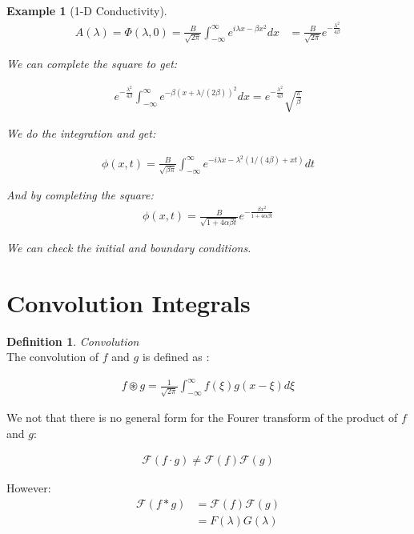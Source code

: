 \documentclass{article}
\newtheorem{ex}{Example}
\theoremstyle{definition}
\newtheorem{definition}{Definition}[section]
\newcommand{\Def}[2]{
\begin{shaded*}
\begin{definition}{\textit{#1}}\\#2\end{definition}
\end{shaded*}
}
\def\F{\mathcal{F}}
\def\conv{\circledast}
\begin{document}
\begin{ex}[1-D Conductivity]
\begin{align*}
A(\lambda) = \Phi(\lambda, 0) = \frac{B}{\sqrt{2 \pi}} \int_{-\infty}^{\infty}  e^{i\lambda x - \beta x^2} dx
&= \frac{B}{\sqrt{2 \pi}}  e^{-\frac{\lambda^2}{4\beta}}
\end{align*}

We can complete the square to get:

\begin{align*}
e^{-\frac{\lambda^2}{4\beta}} \int_{-\infty}^\infty e^{-\beta (x + \lambda / (2\beta))^2} dx = e^{-\frac{\lambda^2}{4\beta}} \sqrt{\frac{\pi}{\beta}}
\end{align*}

We do the integration and get:

\begin{align*}
\phi(x,t) = \frac{B}{\sqrt{\beta \pi}} \int_{-\infty}^\infty e^{- i \lambda x-\lambda^2 (1/(4\beta) + x t)} dt 
\end{align*}

And by completing the square: 
\begin{align*}
\phi(x,t) = \frac{B}{\sqrt{1 + 4 \alpha \beta t}} e^{-\frac{\beta x^2}{1 + 4 \alpha \beta t}}
\end{align*}

We can check the initial and boundary conditions.

\end{ex}


\section{Convolution Integrals}

\Def{Convolution}{
The convolution of $f$ and $g$ is defined as :

\begin{align*}
f \conv g = \frac{1}{\sqrt{2 \pi}} \int_{-\infty}^{\infty} f(\xi) g(x - \xi) d\xi
\end{align*}

}

We not that there is no general form for the Fourer transform of the product of $f$ and $g$:

\begin{align*}
\F (f \cdot g) \neq \F (f) \F (g)
\end{align*}

However:
\begin{align}
\F (f * g) &= \F(f) \F (g) \\ 
& = F(\lambda ) G(\lambda)
\end{align}
\end{document}
